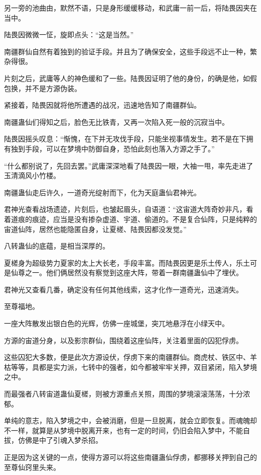 \begin{this_body}
另一旁的池曲由，默然不语，只是身形缓缓移动，和武庸一前一后，将陆畏因夹在当中。

陆畏因微微一怔，旋即点头：“这是当然。”

南疆群仙自然有着独到的验证手段。并且为了确保安全，这些手段远不止一种，繁杂得很。

片刻之后，武庸等人的神色缓和了一些。陆畏因证明了他的身份，的确是他，如假包换，并不是方源伪装。

紧接着，陆畏因就将他所遭遇的战况，迅速地告知了南疆群仙。

南疆蛊仙们得知之后，脸色无比铁青，又再一次陷入死一般的沉寂当中。

陆畏因摇头叹息：“惭愧，在下并无攻伐手段，只能坐视事情发生。若不是在下拥有独到手段，可以在梦境中防御自身，恐怕此刻也落入方源之手了。”

“什么都别说了，先回去罢。”武庸深深地看了陆畏因一眼，大袖一甩，率先走进了玉清滴风小竹楼。

南疆蛊仙走后许久，一道奇光绽射而下，化为天庭蛊仙君神光。

君神光查看战场遗迹，片刻后，也皱起眉头，自语道：“这宙道大阵奇妙非凡，看着道痕的痕迹，应当是没有掺杂虚道、宇道、偷道的。不是复合仙阵，只是纯粹的宙道仙阵，居然也能隐匿自身，让夏槎、陆畏因都没发觉。”

八转蛊仙的底蕴，是相当深厚的。

夏槎身为超级势力夏家的太上大长老，手段丰富。而陆畏因更是乐土传人，乐土可是仙尊之一。他们俩居然没有察觉到这座大阵，带着一群南疆蛊仙中了埋伏。

君神光又查看几番，确定没有任何其他线索，这才化作一道奇光，迅速消失。

至尊福地。

一座大阵散发出银白色的光辉，仿佛一座城堡，突兀地悬浮在小绿天中。

方源的宙道分身，以及影宗群仙，围绕着这座仙阵，关注着里面的囚犯俘虏。

这些囚犯大多数，便是此次方源设伏，俘虏下来的南疆群仙。商虎杖、铁区中、羊枯等等，具都是实力派，七转中的强者，如今都被牢牢关押，双目紧闭，陷入梦境之中。

而最强者八转宙道蛊仙夏槎，则被方源重点关照，周围的梦境滚滚荡荡，十分浓郁。

单纯的意志，陷入梦境之中，会被消磨，但是一旦脱离，就会立即恢复。而魂魄却不一样，就算是从梦境中脱离开来，也有一定的时间，仍旧会陷入梦中，不能自拔，仿佛是中了引魂入梦杀招。

正是因为这关键的一点，使得方源可以将这些南疆蛊仙俘虏，都挪移关押到自己的至尊仙窍里头来。


\end{this_body}
